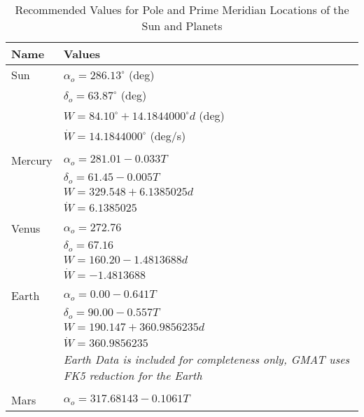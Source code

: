 {\begin{table*} \caption{Recommended Values for Pole and Prime Meridian Locations of the Sun and
Planets\cite{Seidelmann:etal:02}} 
\centering
\begin{tabular}{p{.5 in} p{4.5 in} }
  \hline\hline
   Name & Values  \\
  \hline
  Sun & $\alpha_o = 286.13^{\circ}$ \hspace{.2 in} (deg)\\
       & $\delta_o = 63.87^{\circ}$ \hspace{.2 in} (deg)\\
       &$W = 84.10^{\circ}+ 14.1844000^{\circ}d$  \hspace{.2 in} (deg)\\
       &$\dot{W} =14.1844000^{\circ}$  \hspace{.2 in} (deg/s)\\
       & \\
  Mercury & $\alpha_o = 281.01 - 0.033T$\\
       & $\delta_o = 61.45 - 0.005T$\\
       & $W = 329.548 + 6.1385025d$\\
       &$\dot{W} =6.1385025$\\
       & \\
   Venus & $\alpha_o = 272.76$\\
       & $\delta_o = 67.16$\\
       & $W = 160.20 - 1.4813688d$\\
       &$\dot{W} = - 1.4813688$\\
       & \\
     Earth& $\alpha_o = 0.00 - 0.641T$\\
       & $\delta_o =  90.00 - 0.557T$ \\
       & $W = 190.147 + 360.9856235d$\\
       &$\dot{W} = 360.9856235$\\
       & \emph{Earth Data is included for completeness only, GMAT uses FK5 reduction for the Earth}\\
       & \\
   Mars & $\alpha_o = 317.68143 - 0.1061T$\\

\end{tabular}
\end{table*}}
